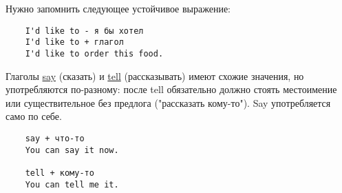 Нужно запомнить следующее устойчивое выражение:
\begin{verbatim}
    I'd like to - я бы хотел
    I'd like to + глагол
    I'd like to order this food.
\end{verbatim}

Глаголы \underline{say} (сказать) и \underline{tell} (рассказывать) имеют схожие значения, но употребляются
по-разному: после tell обязательно должно стоять местоимение или существительное без предлога ("рассказать
кому-то"). Say употребляется само по себе.
\begin{verbatim}
    say + что-то
    You can say it now.

    tell + кому-то
    You can tell me it.
\end{verbatim}